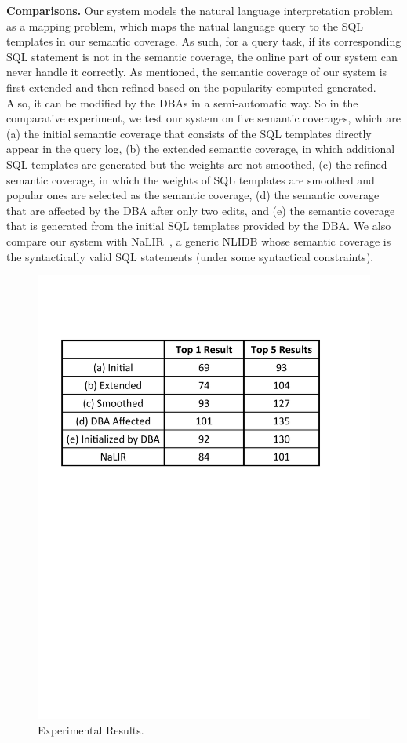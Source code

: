 \documentclass{vldb}
\begin{document}
\textbf{Comparisons.}
Our system models the natural language interpretation problem as a mapping problem, which maps the natual language query to the SQL templates in our semantic coverage.  As such, for a query task, if its corresponding SQL statement is not in the semantic coverage, the online part of our system can never handle it correctly.  As mentioned, the semantic coverage of our system is first extended and then refined based on the popularity computed generated.  Also, it can be modified by the DBAs in a semi-automatic way.  So in the comparative experiment, we test our system on five semantic coverages, which are (a) the initial semantic coverage that consists of the SQL templates directly appear in the query log, (b) the extended semantic coverage, in which additional SQL templates are generated but the weights are not smoothed, (c) the refined semantic coverage, in which the weights of SQL templates are smoothed and popular ones are selected as the semantic coverage, (d) the semantic coverage that are affected by the DBA after only two edits, and (e) the semantic coverage that is generated from the initial SQL templates provided by the DBA.  We also compare our system with NaLIR~\cite{DBLP:journals/pvldb/LiJ14}, a generic NLIDB whose semantic coverage is the syntactically valid SQL statements (under some syntactical constraints).  

\begin{figure}
  \center
  \includegraphics[width=0.75\linewidth]{pic/experimentsOnline.pdf}
  \caption{Experimental Results.}
  \label{fig:experiments}
\end{figure}
\end{document}
